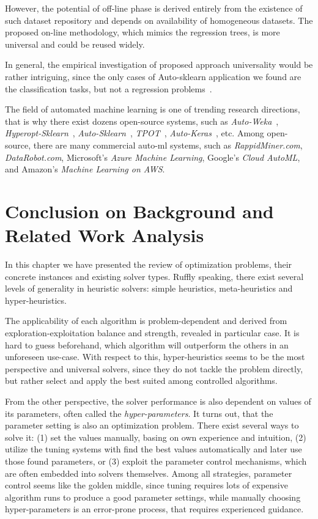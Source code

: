 However, the potential of off-line phase is derived entirely from the existence of such dataset repository and depends on availability of homogeneous datasets. The proposed on-line methodology, which mimics the regression trees, is more universal and could be reused widely.

In general, the empirical investigation of proposed approach universality would be rather intriguing, since the only cases of Auto-sklearn application we found are the classification tasks, but not a regression problems~\cite{feurer2015efficient,biedenkapp-ecai20}.


The field of automated machine learning is one of trending research directions, that is why there exist dozens open-source systems, such as \textit{Auto-Weka}~\cite{thornton2013auto}, \textit{Hyperopt-Sklearn}~\cite{komer2014hyperopt}, \textit{Auto-Sklearn}~\cite{feurer2015efficient}, \textit{TPOT}~\cite{olson2019tpot}, \textit{Auto-Keras}~\cite{jin2019auto}, etc. Among open-source, there are many commercial auto-ml systems, such as \textit{RappidMiner.com}, \textit{DataRobot.com}, Microsoft’s \textit{Azure Machine Learning}, Google’s \textit{Cloud AutoML}, and Amazon's \textit{Machine Learning on AWS}.


\section{Conclusion on Background and Related Work Analysis}\label{bg: conclusion}
In this chapter we have presented the review of optimization problems, their concrete instances and existing solver types.
Ruffly speaking, there exist several levels of generality in heuristic solvers: simple heuristics, meta-heuristics and hyper-heuristics.

The applicability of each algorithm is problem-dependent and derived from exploration-exploitation balance and strength, revealed in particular case.
It is hard to guess beforehand, which algorithm will outperform the others in an unforeseen use-case.
With respect to this, hyper-heuristics seems to be the most perspective and universal solvers, since they do not tackle the problem directly, but rather select and apply the best suited among controlled algorithms.

From the other perspective, the solver performance is also dependent on values of its parameters, often called the \textit{hyper-parameters}.
It turns out, that the parameter setting is also an optimization problem.
There exist several ways to solve it: (1) set the values manually, basing on own experience and intuition, (2) utilize the tuning systems with find the best values automatically and later use those found parameters, or (3) exploit the parameter control mechanisms, which are often embedded into solvers themselves. 
Among all strategies, parameter control seems like the golden middle, since tuning requires lots of expensive algorithm runs to produce a good parameter settings, while manually choosing hyper-parameters is an error-prone process, that requires experienced guidance.

